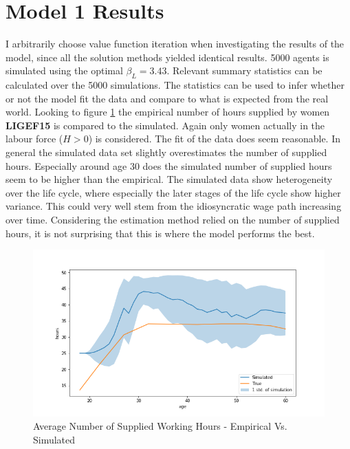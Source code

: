 \section{Model 1 Results}

I arbitrarily choose value function iteration when investigating the results of the model, since all the solution methods yielded identical results. 5000 agents is simulated using the optimal $\beta_L = 3.43$. Relevant summary statistics can be calculated over the 5000 simulations. The statistics can be used to infer whether or not the model fit the data and compare to what is expected from the real world. Looking to figure \ref{fig:dqi_model1_average_path_sim_vs_empirical} the empirical number of hours supplied by women \textbf{LIGEF15} is compared to the simulated. Again only women actually in the labour force  ($H>0$) is considered. The fit of the data does seem reasonable. In general the simulated data set slightly overestimates the number of supplied hours. Especially around age 30 does the simulated number of supplied hours seem to be higher than the empirical. The simulated data show heterogeneity over the life cycle, where especially the later stages of the life cycle show higher variance. This could very well stem from the idiosyncratic wage path increasing over time. Considering the estimation method relied on the number of supplied hours, it is not surprising that this is where the model performs the best. 


\begin{figure}
    \centering
    \includegraphics[scale=0.4]{figures/dqi_model1_estimation_labour_supply.png}
    \caption{Average Number of Supplied Working Hours - Empirical Vs. Simulated}
    \label{fig:dqi_model1_average_path_sim_vs_empirical}
\end{figure}

